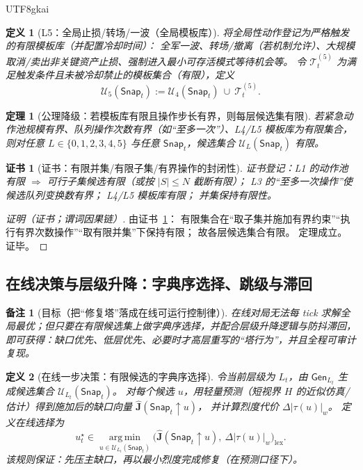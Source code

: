 \documentclass[12pt]{article}
\newtheorem{definition}{定义}[section]
\newtheorem{theorem}{定理}[section]
\newtheorem{remark}{备注}[section]
\newtheorem{Certificate}{证书}[section]
\begin{document}
\begin{CJK*}{UTF8}{gkai}
\begin{definition}[L5：全局止损/转场/一波（全局模板库）]
\label{def:openra-gen-l5}
将全局性动作登记为严格触发的有限模板库（并配置冷却时间）：
全军一波、转场/撤离（若机制允许）、大规模取消/卖出非关键资产止损、强制进入最小可存活模式等待机会等。
令 $\mathcal{T}^{(5)}_t$ 为满足触发条件且未被冷却禁止的模板集合（有限），定义
\[
  \mathcal{U}_5(\mathsf{Snap}_t)
  :=
  \mathcal{U}_4(\mathsf{Snap}_t)\ \cup\ \mathcal{T}^{(5)}_t.
\]
\end{definition}

\begin{theorem}[公理降级：若模板库有限且操作步长有界，则每层候选集有限]
\label{thm:openra-generator-finiteness}
若紧急动作池规模有界、队列操作次数有界（如“至多一次”）、L4/L5 模板库为有限集合，
则对任意 $L\in\{0,1,2,3,4,5\}$ 与任意 $\mathsf{Snap}_t$，候选集合 $\mathcal{U}_L(\mathsf{Snap}_t)$ 有限。
\end{theorem}

\begin{Certificate}[证书：有限并集/有限子集/有界操作的封闭性]
\label{cert:openra-generator-finiteness}
证书登记：L1 的动作池有限 $\Rightarrow$ 可行子集候选有限（或按 $|S|\le N$ 截断有限）；
L3 的“至多一次操作”使候选队列变换数有界；
L4/L5 模板库有限；
并集保持有限性。
\end{Certificate}

\begin{proof}[证明（证书；谓词因果链）]
由证书~\ref{cert:openra-generator-finiteness}：
有限集合在“取子集并施加有界约束”“执行有界次数操作”“取有限并集”下保持有限；
故各层候选集合有限。
定理成立。证毕。
\end{proof}

\subsection{在线决策与层级升降：字典序选择、跳级与滞回}
\label{sec:openra-online-policy-and-level-switch}

\begin{remark}[目标（把“修复塔”落成在线可运行控制律）]
在线对局无法每 tick 求解全局最优；但只要在有限候选集上做字典序选择，并配合层级升降逻辑与防抖滞回，
即可获得：缺口优先、低层优先、必要时才高层重写的“塔行为”，并且全程可审计复现。
\end{remark}

\begin{definition}[在线一步决策：有限候选的字典序选择]
\label{def:openra-online-one-step-policy}
令当前层级为 $L_t$，由 $\mathsf{Gen}_{L_t}$ 生成候选集合 $\mathcal{U}_{L_t}(\mathsf{Snap}_t)$。
对每个候选 $u$，用轻量预测（短视界 $H$ 的近似仿真/估计）得到施加后的缺口向量 $\widehat{\mathbf{J}}(\mathsf{Snap}_t\uparrow u)$，
并计算烈度代价 $\Delta|\tau(u)|_w$。
定义在线选择为
\[
  u_t^\star
  \in
  \operatorname*{arg\,min}_{u\in\mathcal{U}_{L_t}(\mathsf{Snap}_t)}
  \bigl(\widehat{\mathbf{J}}(\mathsf{Snap}_t\uparrow u),\ \Delta|\tau(u)|_w\bigr)_{\mathrm{lex}}.
\]
该规则保证：先压主缺口，再以最小烈度完成修复（在预测口径下）。
\end{definition}


\end{CJK*}
\end{document}
